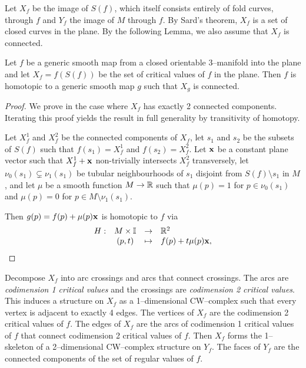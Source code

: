Let $X_f$ be the image of $S(f)$, which itself consists entirely of fold curves, through $f$ and $Y_f$ the image of $M$ through $f$.
By Sard's theorem, $X_f$ is a set of closed curves in the plane.
By the following Lemma, we also assume that $X_f$ is connected.

\begin{lem}
	Let $f$ be a generic smooth map from a closed orientable 3--manifold into the plane and let $X_f=f(S(f))$ be the set of critical values of $f$ in the plane.
	Then $f$ is homotopic to a generic smooth map $g$ such that $X_g$ is connected.
\end{lem}

\begin{proof}
	We prove in the case where $X_f$ has exactly 2 connected components.
	Iterating this proof yields the result in full generality by transitivity of homotopy.
	
	Let $X_f^1$ and $X_f^2$ be the connected components of $X_f$, let $s_1$ and $s_2$ be the subsets of $S(f)$ such that $f(s_1)=X_f^1$ and $f(s_2)=X_f^2$.
	Let ${\bf x}$ be a constant plane vector such that $X_f^1+{\bf x}$ non-trivially intersects $X_f^2$ transversely, let $\nu_0(s_1)\subsetneq\nu_1(s_1)$ be tubular neighbourhoods of $s_1$ disjoint from $S(f)\setminus s_1$ in $M$, and let $\mu$ be a smooth function $M\to\mathbb{R}$ such that $\mu(p)=1$ for $p\in\nu_0(s_1)$ and $\mu(p)=0$ for $p\in M\setminus\nu_1(s_1)$.
	
	Then $g(p)=f(p)+\mu(p){\bf x}$ is homotopic to $f$ via
	\[
		\begin{array}{cccl}
			H: 	& M\times \mathbb{I} & \to & \mathbb{R}^2 \\
				& (p,t)	& \mapsto & f(p)+t\mu(p){\bf x},
		\end{array}
	\]
\end{proof}

Decompose $X_f$ into arc crossings and arcs that connect crossings.
The arcs are \emph{codimension 1 critical values} and the crossings are \emph{codimension 2 critical values}.
This induces a structure on $X_f$ as a 1--dimensional CW--complex such that every vertex is adjacent to exactly 4 edges.
The vertices of $X_f$ are the codimension 2 critical values of $f$.
The edges of $X_f$ are the arcs of codimension 1 critical values of $f$ that connect codimension 2 critical values of $f$.
Then $X_f$ forms the 1--skeleton of a 2--dimensional CW--complex structure on $Y_f$.
The faces of $Y_f$ are the connected components of the set of regular values of $f$.

